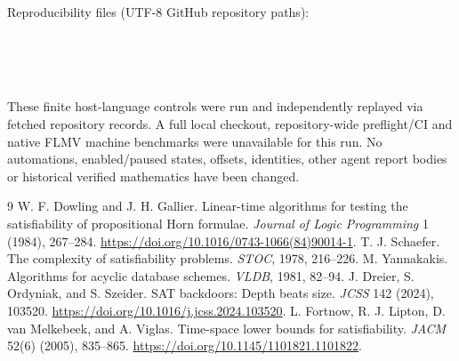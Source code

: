 \documentclass[11pt]{article}
\begin{document}
Reproducibility files (UTF-8 GitHub repository paths):
\begin{center}\footnotesize
{}\\
\\
\\
\end{center}
These finite host-language controls were run and independently
replayed via fetched repository records. A full local checkout,
repository-wide preflight/CI and native FLMV machine benchmarks
were unavailable for this run. No automations, enabled/paused
states, offsets, identities, other agent report bodies or historical
verified mathematics have been changed.

\begin{thebibliography}{9}
 W. F. Dowling and J. H. Gallier.
Linear-time algorithms for testing the satisfiability of propositional
Horn formulae. \emph{Journal of Logic Programming} 1 (1984), 267--284.
\url{https://doi.org/10.1016/0743-1066(84)90014-1}.
 T. J. Schaefer. The complexity of satisfiability
problems. \emph{STOC}, 1978, 216--226.
 M. Yannakakis. Algorithms for acyclic database schemes.
\emph{VLDB}, 1981, 82--94.
 J. Dreier, S. Ordyniak, and S. Szeider.
SAT backdoors: Depth beats size. \emph{JCSS} 142 (2024), 103520.
\url{https://doi.org/10.1016/j.jcss.2024.103520}.
 L. Fortnow, R. J. Lipton, D. van Melkebeek, and A. Viglas.
Time-space lower bounds for satisfiability.
\emph{JACM} 52(6) (2005), 835--865.
\url{https://doi.org/10.1145/1101821.1101822}.
\end{thebibliography}
\end{document}
